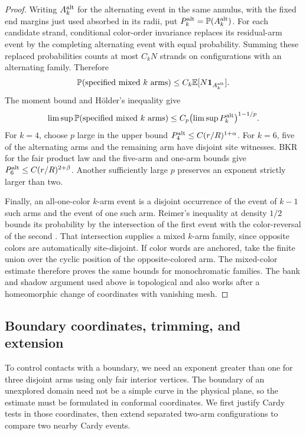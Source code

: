 \begin{proof}
Writing $A_k^{\rm alt}$ for the alternating event in the
same annulus, with the fixed end margins just used absorbed in
its radii, put $P_k^{\rm alt}=\mathbb P(A_k^{\rm alt})$.
For each candidate strand, conditional color-order invariance
replaces its residual-arm event by the completing alternating
event with equal probability.  Summing these replaced
probabilities counts at most $C_kN$ strands on configurations
with an alternating family.  Therefore
\[
 \mathbb P(\text{specified mixed $k$ arms})
 \le C_k\mathbb E[N\mathbf1_{A_k^{\rm alt}}].
\]
The moment bound and H\"older's inequality give
\[
 \limsup\mathbb P(\text{specified mixed $k$ arms})
 \le C_p\bigl(\limsup P_k^{\rm alt}\bigr)^{1-1/p}.
\]
For $k=4$, choose $p$ large in the upper bound
$P_4^{\rm alt}\le C(r/R)^{1+\alpha}$.  For $k=6$, five of
the alternating arms and the remaining arm have disjoint site
witnesses.  BKR for the fair product law and the five-arm and
one-arm bounds give
$P_6^{\rm alt}\le C(r/R)^{2+\beta}$.
Another sufficiently large $p$ preserves an exponent strictly
larger than two.

Finally, an all-one-color $k$-arm event is a disjoint occurrence
of the event of $k-1$ such arms and the event of one such arm.
Reimer's inequality at density $1/2$ bounds its probability by
the intersection of the first event with the color-reversal of
the second \cite{reimer00}.  That intersection supplies a mixed
$k$-arm family, since opposite colors are automatically
site-disjoint.  If color words are anchored, take the finite
union over the cyclic position of the opposite-colored arm.
The mixed-color estimate therefore proves the
same bounds for monochromatic families.  The bank and shadow
argument used above is topological and also works after a
homeomorphic change of coordinates with vanishing mesh.
\end{proof}

\subsection{Boundary coordinates, trimming, and extension}

To control contacts with a boundary, we need an exponent greater
than one for three disjoint arms using only fair interior vertices.
The boundary of an unexplored domain need not be a simple curve in
the physical plane, so the estimate must be formulated in conformal
coordinates.  We first justify Cardy tests in those coordinates,
then extend separated two-arm configurations to compare two nearby
Cardy events.

